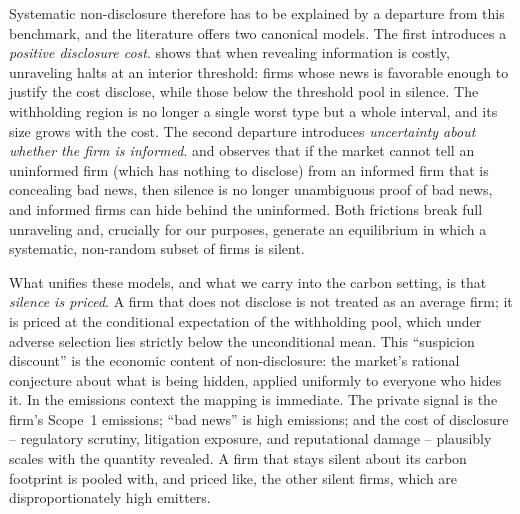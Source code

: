\documentclass[a4paper,12pt]{article}
\newcommand{\citet}[1]{\textcite{#1}}
\begin{document}
Systematic non-disclosure therefore has to be explained by a departure from this benchmark, and the literature offers two canonical models. The first introduces a \emph{positive disclosure cost}. \citet{verrecchia1983discretionary} shows that when revealing information is costly, unraveling halts at an interior threshold: firms whose news is favorable enough to justify the cost disclose, while those below the threshold pool in silence. The withholding region is no longer a single worst type but a whole interval, and its size grows with the cost. The second departure introduces \emph{uncertainty about whether the firm is informed}. \citet{dye1985disclosure} and \citet{jung1988disclosure} observes that if the market cannot tell an uninformed firm (which has nothing to disclose) from an informed firm that is concealing bad news, then silence is no longer unambiguous proof of bad news, and informed firms can hide behind the uninformed. Both frictions break full unraveling and, crucially for our purposes, generate an equilibrium in which a systematic, non-random subset of firms is silent.

What unifies these models, and what we carry into the carbon setting, is that \emph{silence is priced}. A firm that does not disclose is not treated as an average firm; it is priced at the conditional expectation of the withholding pool, which under adverse selection lies strictly below the unconditional mean. This ``suspicion discount'' is the economic content of non-disclosure: the market's rational conjecture about what is being hidden, applied uniformly to everyone who hides it. In the emissions context the mapping is immediate. The private signal is the firm's Scope~1 emissions; ``bad news'' is high emissions; and the cost of disclosure --  regulatory scrutiny, litigation exposure, and reputational damage --  plausibly scales with the quantity revealed. A firm that stays silent about its carbon footprint is pooled with, and priced like, the other silent firms, which are disproportionately high emitters.
\end{document}
